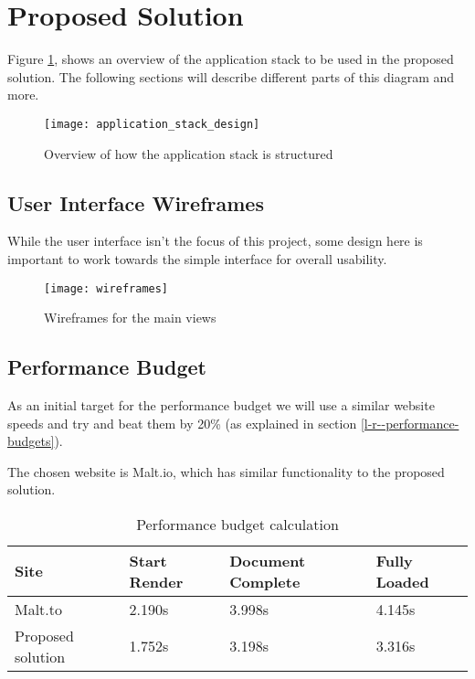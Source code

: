 \section{Proposed Solution} \label{a-d--proposed-solution}

Figure \ref{figure-application-stack-design}, shows an overview of the application stack to be used in the proposed solution. The following sections will describe different parts of this diagram and more.

\begin{figure}[H]
  \centering
    \texttt{[image: application\_stack\_design]}
  \caption{Overview of how the application stack is structured}
  \label{figure-application-stack-design}
\end{figure}

\subsection{User Interface Wireframes}

While the user interface isn't the focus of this project, some design here is important to work towards the simple interface for overall usability.

\begin{figure}[H]
  \centering
    \texttt{[image: wireframes]}
  \caption{Wireframes for the main views}
  \label{figure-wireframes}
\end{figure}

\subsection{Performance Budget}

As an initial target for the performance budget we will use a similar website speeds and try and beat them by 20\% (as explained in section \ref{l-r--performance-budgets}).

The chosen website is Malt.io, which has similar functionality to the proposed solution.

\begin{table}[H]
\centering
\begin{tabular}{|l|l|l|l|}
\hline
\textbf{Site}     & \textbf{Start Render} & \textbf{Document Complete} & \textbf{Fully Loaded} \\ \hline
Malt.to           & 2.190s                & 3.998s                     & 4.145s                \\ \hline
Proposed solution & 1.752s                & 3.198s                     & 3.316s                \\ \hline
\end{tabular}
\caption{Performance budget calculation}
\label{table-performance-budget}
\end{table}

